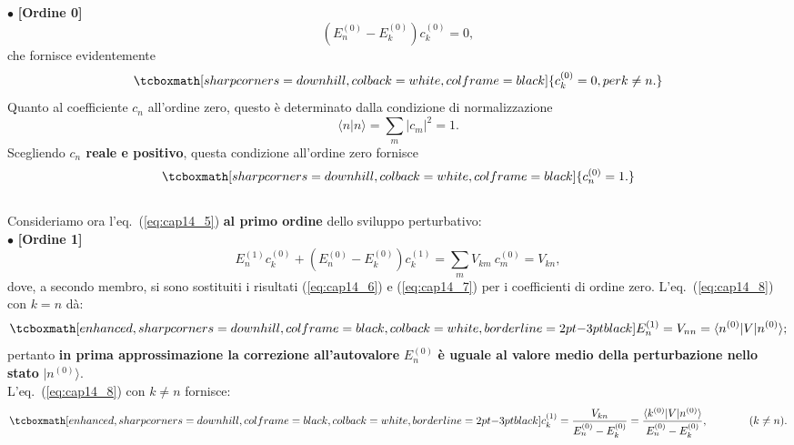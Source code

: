 \documentclass[a4paper,12pt,oneside]{book}
\begin{document}
$\bullet$ \textbf{[Ordine 0]}\\
	\begin{equation}
		\left(E_n ^{(0)}- E_k ^{(0)}\right)c_k ^{(0)}=0,
	\end{equation}
che fornisce evidentemente
	\begin{equation}
		\tcboxmath[sharp corners=downhill, colback=white, colframe=black]{	
			c_k ^{(0)}=0, per k\neq n.
			}
	\label{eq:cap14_6}
	\end{equation}
Quanto al coefficiente $c_n$ all'ordine zero, questo è determinato dalla condizione di normalizzazione
	\begin{equation}
		\langle n \vert n \rangle = \sum _m \vert c_m \vert ^2 =1.
	\end{equation}
Scegliendo \textbf{$c_n$ reale e positivo}, questa condizione all'ordine zero fornisce
	\begin{equation}
		\tcboxmath[sharp corners=downhill, colback=white, colframe=black]{
			c_n ^{(0)}=1.
			}
	\label{eq:cap14_7}
	\end{equation}\\
	
Consideriamo ora l'eq.~(\ref{eq:cap14_5}) \textbf{al primo ordine} dello sviluppo perturbativo:\\

$\bullet$ \textbf{[Ordine 1]}\\
	\begin{equation}
		E_n ^{(1)}c_k ^{(0)}+\left(E_n ^{(0)}- E_k ^{(0)}\right)c_k ^{(1)}=\sum _m V_{km}\ c_m ^{(0)} = V_{kn},
	\label{eq:cap14_8}
	\end{equation}
dove, a secondo membro, si sono sostituiti i risultati (\ref{eq:cap14_6}) e (\ref{eq:cap14_7}) per i coefficienti di ordine zero. L'eq.~(\ref{eq:cap14_8}) con $k=n$ dà:
	\begin{equation}
		\tcboxmath[enhanced, sharp corners=downhill, colframe=black, colback=white, borderline={2pt}{-3pt}{black}]{
			E_n  ^{(1)} = V_{nn} = \langle n^{(0)}\vert V \vert n^{(0)} \rangle ;
			}
	\end{equation}
pertanto \textbf{in prima approssimazione la correzione all'autovalore} $E_n ^{(0)}$ \textbf{è uguale al valore medio della perturbazione nello stato} $\vert n^{(0)} \rangle$.\\

L'eq.~(\ref{eq:cap14_8})  con $k\neq n$ fornisce:
	\begin{equation}
		\tcboxmath[enhanced, sharp corners=downhill, colframe=black, colback=white, borderline={2pt}{-3pt}{black}]{
			c_k ^{(1)} = \frac{V_{kn}}{E_n ^{(0)}-E_k ^{(0)}}=\frac{\langle k^{(0)}\vert V \vert n^{(0)} \rangle}{E_n ^{(0)}-E_k ^{(0)}}, }\qquad \qquad (k\neq n).			
	\label{eq:cap14_9}
	\end{equation}\\
	  
\end{document}
